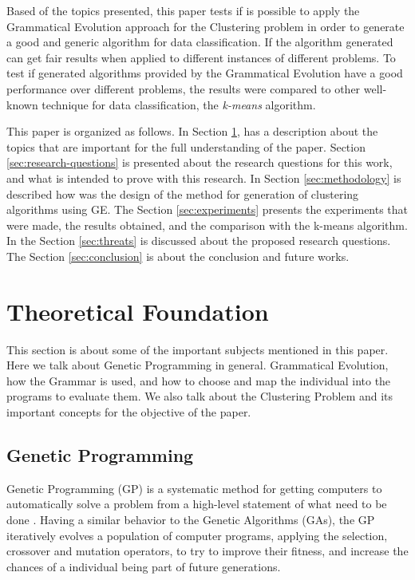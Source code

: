 \documentclass[journal]{IEEEtran}
\begin{document}
Based of the topics presented, this paper tests if is possible to apply the Grammatical Evolution approach for the Clustering problem in order to generate a good and generic algorithm for data classification. If the algorithm generated can get fair results when applied to different instances of different problems. To test if generated algorithms provided by the Grammatical Evolution have a good performance over different problems, the results were compared to other well-known technique for data classification, the \textit{k-means} algorithm.

This paper is organized as follows. In Section \ref{sec:theoretical_foudation}, has a description about the topics that are important for the full understanding of the paper. Section \ref{sec:research-questions} is presented about the research questions for this work, and what is intended to prove with this research. In Section \ref{sec:methodology} is described how was the design of the method for generation of clustering algorithms using GE. The Section \ref{sec:experiments} presents the experiments that were made, the results obtained, and the comparison with the k-means algorithm. In the Section \ref{sec:threats} is discussed about the proposed research questions. The Section \ref{sec:conclusion} is about the conclusion and future works.

\section{Theoretical Foundation} \label{sec:theoretical_foudation}

This section is about some of the important subjects mentioned in this paper. Here we talk about Genetic Programming in general. Grammatical Evolution, how the Grammar is used, and how to choose and map the individual into the programs to evaluate them. We also talk about the Clustering Problem and its important concepts for the objective of the paper.

\subsection{Genetic Programming}

Genetic Programming (GP) is a systematic method for getting computers to automatically solve a problem from a high-level statement of what need to be done \cite{koza2005genetic}. Having a similar behavior to the Genetic Algorithms (GAs), the GP iteratively evolves a population of computer programs, applying the selection, crossover and mutation operators, to try to improve their fitness, and increase the chances of a individual being part of future generations.
\end{document}
